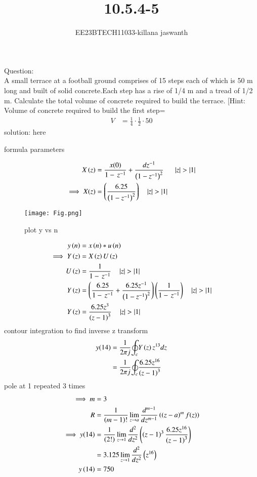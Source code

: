 \documentclass[journal,12pt,twocolumn]{IEEEtran}
\theoremstyle{remark}
\begin{document}

\vspace{3cm}

\title{10.5.4-5}
\author{EE23BTECH11033-killana jaswanth}
\maketitle
\newpage

\bigskip

\renewcommand{\thefigure}{\theenumi}
\renewcommand{\thetable}{\theenumi}
Question:\\
A small terrace at a football ground comprises of 15 steps each of which is 50
m long and built of solid concrete.Each step has a rise of 1/4 m and a tread of
1/2 m. Calculate the total volume of concrete required to build the terrace.
[Hint: Volume of concrete required to build the first step=\begin{align}
    V&=\frac{1}{4} \cdot \frac{1}{2} \cdot 50 
\end{align}
solution:
here\begin{table}[!ht]
 \centering
  
   \caption{formula parameters}
   \label{tab:10.5.4.5}
   \end{table}
\begin{align}
 X\left(z\right)&=\frac{x(0)}{1-\,z^{-1}}+\frac{dz^{-1}}{\left(1-{z^{-1}}\right)^2}\:\:
\quad\left\vert z\right\vert>\left\vert1\right\vert\\
\implies X(z)&=\left(\frac{6.25}{\left(1-z^{-1}\right)^2}\right) \quad\left\vert z\right\vert>\left\vert1\right\vert
\end{align}
\begin{figure}[!ht]
    \centering
    \texttt{[image: Fig.png]}
    \caption{plot y vs n}
    \label{fig:enter-label}
\end{figure}
\begin{align}
y\left(n\right)&=x\left(n\right)*u\left(n\right)\\
\implies Y\left(z\right)&=X\left(z\right)U\left(z\right)\\
U\left(z\right)&=\frac{1}{1-\,z^{-1}}\quad\left\vert z\right\vert>\left\vert1\right\vert\\
Y\left(z\right)&=\left(\frac{6.25}{1-\,z^{-1}}+\frac{6.25z^{-1}}{\left(1-{z^{-1}}\right)^2}\right)\left(\frac{1}{1-\,z^{-1}}\right)\quad\left\vert z\right\vert>\left\vert1\right\vert\\
Y\left(z\right)&=\frac{6.25z^3}{\left(z-1\right)^{3}} \quad\left\vert z\right\vert>\left\vert1\right\vert
\end{align}
  contour integration to find inverse z transform
\begin{align}
y(14)&=\frac{1}{2{\pi}j}{\oint_c}Y\left(z\right)z^{13}dz\\
&=\frac{1}{2{\pi}j}{\oint_c}{\frac{6.25z^{16}}{\left(z-1\right)^{3}}}
\end{align}
pole at 1 repeated 3 times\\
\begin{align}
\implies m&=3\\
R&=\frac{1}{\left(m-1\right)!}\lim_{z\to a}\frac{d^{m-1}}{dz^{m-1}}\left(\left(z-a\right)^mf{\left(z\right)}\right)\\
\implies y(14)&=\frac{1}{\left(2!\right)}\lim_{z\to 1}\frac{d^2}{dz^2}\left(\left(z-1\right)^{3}\frac{6.25z^{16}}{\left(z-1\right)^3}\right)\\
&=3.125\lim_{z\to1}\frac{d^2}{dz^2}\left(z^{16}\right)\\
y\left(14\right)&=750
\end{align}
 
\end{document}
